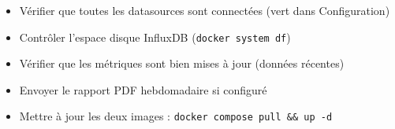 \documentclass[11pt, a4paper]{article}
\begin{document}
\begin{checklist}
  \begin{itemize}
    \item[$\square$] Vérifier que toutes les datasources sont connectées (vert dans Configuration)
    \item[$\square$] Contrôler l'espace disque InfluxDB (\texttt{docker system df})
    \item[$\square$] Vérifier que les métriques sont bien mises à jour (données récentes)
    \item[$\square$] Envoyer le rapport PDF hebdomadaire si configuré
    \item[$\square$] Mettre à jour les deux images : \texttt{docker compose pull \&\& up -d}
  \end{itemize}
\end{checklist}
\end{document}
